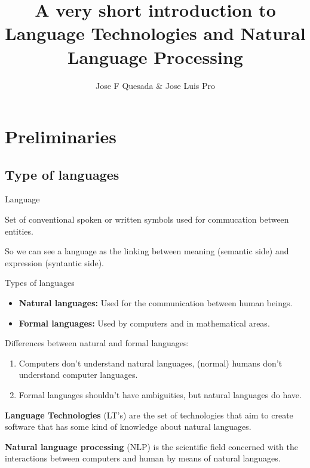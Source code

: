 \documentclass[11pt]{beamer}
\title[Language technologies and natural language processing]{A very short introduction to Language Technologies and Natural Language Processing}
\author{Jose F Quesada \& Jose Luis Pro}
\date{}
\begin{document}
\begin{frame}
\titlepage
\end{frame}

\section{Preliminaries}
\subsection{Type of languages}

\begin{frame}
	\begin{block}{Language}
		\begin{center}
			Set of conventional spoken or written symbols used for commucation between entities.\par
			\pause
			So we can see a language as the linking between meaning (semantic side) and expression (syntantic side).
		\end{center}
	\end{block}
	\pause
	\vspace{15pt}
	Types of languages
	\begin{itemize}
		\item \textbf{Natural languages:} Used for the communication between human beings.
		\item \textbf{Formal languages:} Used by computers and in mathematical areas.
	\end{itemize}
\end{frame}

\begin{frame}
	\begin{block}{Differences between natural and formal languages:}
		\begin{enumerate}
			\item Computers don't understand natural languages, (normal) humans don't understand computer languages.
			\pause
			\item Formal languages shouldn't have ambiguities, but natural languages do have.
		\end{enumerate}
	\end{block} 
	\vspace{10pt}
	\pause 
	\textbf{Language Technologies} (LT's) are the set of technologies that aim to create software that has some kind of knowledge about natural languages. \par
	\vspace{10pt}
	\pause
	\textbf{Natural language processing} (NLP) is the scientific field concerned with the interactions between computers and human by means of natural languages.
\end{frame}
\end{document}
